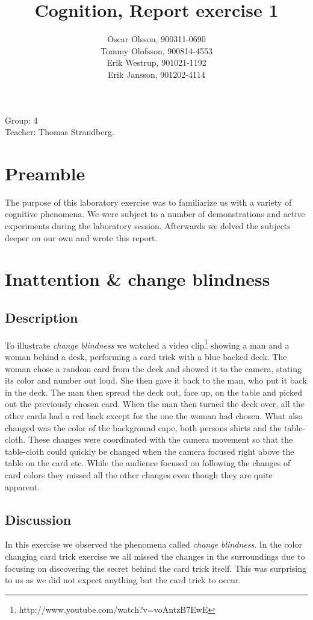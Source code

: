 \documentclass[10pt, a4paper]{article}
\title{Cognition, Report exercise 1}
\date{}
\author{Oscar Olsson, 900311-0690\\ Tommy Olofsson, 900814-4553\\
	Erik Westrup, 901021-1192\\ Erik Jansson, 901202-4114}
\begin{document}
\maketitle
\begin{center}
Group: 4 \\
Teacher: Thomas Strandberg.
\end{center}
\newpage

\section{Preamble}
The purpose of this laboratory exercise was to familiarize us with a variety of cognitive phenomena. We were subject to a number of demonstrations and active experiments during the laboratory session. Afterwards we delved the subjects deeper on our own and wrote this report.

\section{Inattention \& change blindness}
\subsection{Description}
To illustrate \emph{change blindness} we watched a video clip\footnote{http://www.youtube.com/watch?v=voAntzB7EwE} showing a man and a woman behind a desk, performing a card trick with a blue backed deck. The woman chose a random card from the deck and showed it to the camera, stating its color and number out loud. She then gave it back to the man, who put it back in the deck. The man then spread the deck out, face up, on the table and picked out the previously chosen card. When the man then turned the deck over, all the other cards had a red back except for the one the woman had chosen. What also changed was the color of the background cape, both persons shirts and the table-cloth. These changes were coordinated with the camera movement so that the table-cloth could quickly be changed when the camera focused right above the table on the card etc. While the audience focused on following the changes of card colors they missed all the other changes even though they are quite apparent.

\subsection{Discussion}
In this exercise we observed the phenomena called \emph{change blindness}. In the color changing card trick exercise we all missed the changes in the surroundings due to focusing on discovering the secret behind the card trick itself. This was surprising to us as we did not expect anything but the card trick to occur. 
\end{document}
